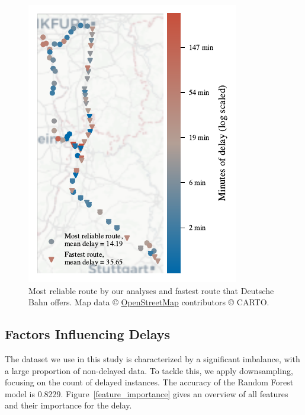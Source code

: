 \documentclass{article}
\theoremstyle{plain}
\theoremstyle{definition}
\theoremstyle{remark}
\begin{document}
\begin{figure} %
\includegraphics{./fig/maps_KI_03_reliable_vs_fastest_zoomed_Carto.pdf} %
\caption{Most reliable route by our analyses and fastest route that Deutsche Bahn offers. Map data © \href{https://www.openstreetmap.org/}{OpenStreetMap} contributors © CARTO.}
\label{rel_fast_zoomed}
\end{figure}

\subsection{Factors Influencing Delays}\label{sec:results_ext}

The dataset we use in this study is characterized by a significant imbalance, with a large proportion of non-delayed data. To tackle this, we apply downsampling, focusing on the count of delayed instances. The accuracy of the Random Forest model is 0.8229. Figure~\ref{feature_importance} gives an overview of all features and their importance for the delay.
\end{document}
